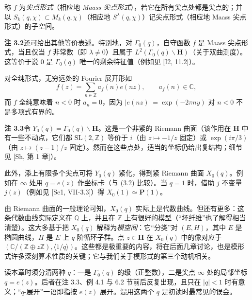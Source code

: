 称 $f$ 为\emph{尖点形式}（相应地 \emph{Maass 尖点形式}），若它在所有尖点处都是尖点的；并以 $S_{k}(q,\chi)\subset M_{k}(q,\chi)$（相应地 $S^{\lambda}(q,\chi)$）记尖点形式（相应地 Maass 尖点形式）的子空间。

\par\medskip\noindent\textbf{注 3.2}\quad 还可给出其他等价表述。特别地，对 $\Gamma_{0}(q)$，自守函数 $f$ 是 Maass 尖点形式，当且仅当 $f$ 非常数（即 $\lambda\ne0$）且属于 $L^{2}(\Gamma_{0}(q)\backslash\mathbf{H})$（关于双曲测度）。这等价于说 $0$ 是 $\Gamma_{0}(q)$ 唯一的剩余特征值（例如见 [I2, 11.2]）。

对全纯形式，无穷远处的 Fourier 展开形如
\begin{equation}\tag{3.2}\label{c3:eq:3.2}
f(z)=\sum_{n\in\mathbb{Z}}a_{f}(n)e(nz),\qquad a_{f}(n)\in\mathbb{C},
\end{equation}
而 $f$ 全纯意味着 $n<0$ 时 $a_{n}=0$，因为 $|e(nz)|=\exp(-2\pi ny)$ 对 $n<0$ 不是多项式有界的。

\par\medskip\noindent\textbf{注 3.3}\quad 令 $Y_{0}(q)=\Gamma_{0}(q)\backslash\mathbf{H}$。这是一个非紧的 Riemann 曲面（该作用在 $\mathbf{H}$ 中有一些不动点，它们都 $\mathrm{SL}(2,\mathbb{Z})$ 等价于 $i$（由 $z\mapsto-1/z$ 固定）或 $\exp(i\pi/3)$（由 $z\mapsto(z-1)/z$ 固定）。然而在这些点处，适当的坐标仍给出复结构；细节见 [Sh, 第 1 章]）。

此外，添上有限多个尖点可将 $Y_{0}(q)$ 紧化，得到紧 Riemann 曲面 $X_{0}(q)$。例如在 $\infty$ 处用 $q=e(z)$ 作坐标卡（与 (3.2) 比较）。当 $q=1$ 时，借助 $j$ 不变量 $j(z)$（例如见 [Se1, VII-3.3]）得 $X_{0}(1)\simeq\mathbf{P}(1)$。

由 Riemann 曲面的一般理论可知，$X_{0}(q)$ 实际上是代数曲线。但还有更多：这条代数曲线实际定义在 $\mathbb{Q}$ 上，并且在 $\mathbb{Z}$ 上有很好的模型（“坏纤维”也了解得相当清楚）。这大多基于把 $X_{0}(q)$ 解释为\emph{模空间}：它“分类”对 $(E,H)$，其中 $E$ 是椭圆曲线，$H$ 是 $E$ 上 $q$ 阶循环子群。点 $z\in\mathbf{H}$ 在 $X_{0}(q)$ 中的像对应于 $(\mathbb{C}/(\mathbb{Z}\oplus z\mathbb{Z}),\langle1/q\rangle)$。这些都是极重要的内容，将在后面几章讨论，也是模形式许多深刻算术性质的关键；它与我们关于模形式的第三个动机相关。

\begin{annote}
读本章时须分清两种 $q$：一是 $\Gamma_{0}(q)$ 的级（正整数），二是尖点 $\infty$ 处的局部坐标 $q=e(z)$。后者在注 3.3、例 4.1 与 6.2 节前后反复出现，且只在 $|q|<1$ 时有意义；“$q$-展开”一语即指按 $e(z)$ 展开。混用这两个 $q$ 是初读时最常见的误会。
\par\vspace{0.15em}{\raggedleft 【来源：本库术语与译法（I）；Iwaniec《Topics in Classical Automorphic Forms》第 2 章（A）】\par}
\end{annote}

